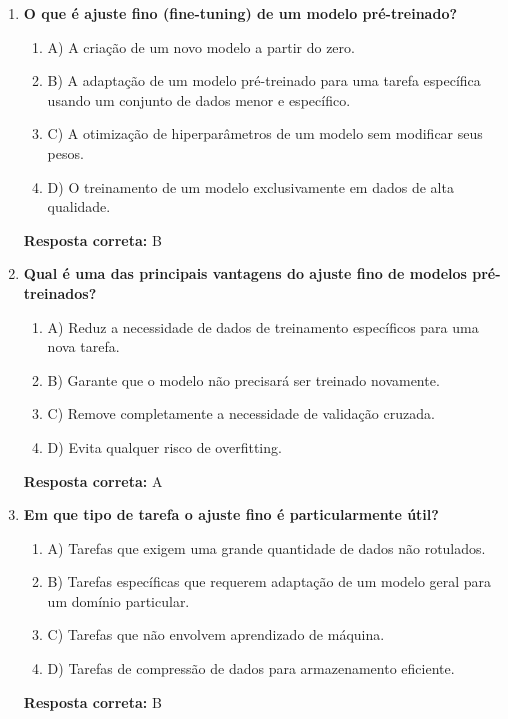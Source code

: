 \documentclass[14pt,a4paper,oneside]{book}
\begin{document}
\begin{enumerate}
	
	\item \textbf{O que é ajuste fino (fine-tuning) de um modelo pré-treinado?}
	\begin{enumerate}[label=\alph*)]
		\item A) A criação de um novo modelo a partir do zero.
		\item B) A adaptação de um modelo pré-treinado para uma tarefa específica usando um conjunto de dados menor e específico.
		\item C) A otimização de hiperparâmetros de um modelo sem modificar seus pesos.
		\item D) O treinamento de um modelo exclusivamente em dados de alta qualidade.
	\end{enumerate}
	\vspace{5mm}
	\textbf{Resposta correta:} B
	
	\item \textbf{Qual é uma das principais vantagens do ajuste fino de modelos pré-treinados?}
	\begin{enumerate}[label=\alph*)]
		\item A) Reduz a necessidade de dados de treinamento específicos para uma nova tarefa.
		\item B) Garante que o modelo não precisará ser treinado novamente.
		\item C) Remove completamente a necessidade de validação cruzada.
		\item D) Evita qualquer risco de overfitting.
	\end{enumerate}
	\vspace{5mm}
	\textbf{Resposta correta:} A
	
	\item \textbf{Em que tipo de tarefa o ajuste fino é particularmente útil?}
	\begin{enumerate}[label=\alph*)]
		\item A) Tarefas que exigem uma grande quantidade de dados não rotulados.
		\item B) Tarefas específicas que requerem adaptação de um modelo geral para um domínio particular.
		\item C) Tarefas que não envolvem aprendizado de máquina.
		\item D) Tarefas de compressão de dados para armazenamento eficiente.
	\end{enumerate}
	\vspace{5mm}
	\textbf{Resposta correta:} B
	

\end{enumerate}
\end{document}
